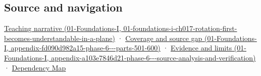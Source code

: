 \subsection{Source and navigation}\label{appendix-f77eadcc4a93-source-and-navigation}

\href{../01-Foundations-I/main.pdf\#nameddest=01-foundations-i-ch017-rotation-first-becomes-understandable-in-a-plane}{Teaching narrative (01-Foundations-I, 01-foundations-i-ch017-rotation-first-becomes-understandable-in-a-plane)} · \href{../01-Foundations-I/main.pdf\#nameddest=appendix-fd090d982a15-phase-6---parts-501-600}{Coverage and source gap (01-Foundations-I, appendix-fd090d982a15-phase-6-\/-\/-parts-501-600)} · \href{../01-Foundations-I/main.pdf\#nameddest=appendix-a103e7846d21-phase-6---source-analysis-and-verification}{Evidence and limits (01-Foundations-I, appendix-a103e7846d21-phase-6-\/-\/-source-analysis-and-verification)} · \hyperref[appendix-4ad47bdd269a]{Dependency Map}
